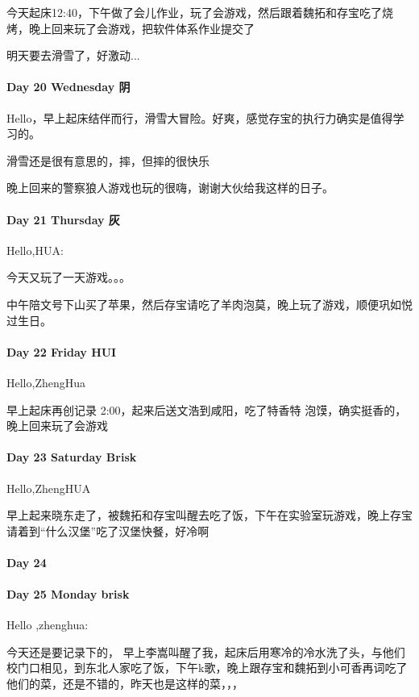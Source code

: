 \documentclass[UTF8,a4paper,8pt]{ctexbook}
\begin{document}
	     今天起床12:40，下午做了会儿作业，玩了会游戏，然后跟着魏拓和存宝吃了烧烤，晚上回来玩了会游戏，把软件体系作业提交了
	     
	     明天要去滑雪了，好激动...
     
     \paragraph{Day 20  Wednesday   \quad    阴 }
     
	     Hello，早上起床结伴而行，滑雪大冒险。好爽，感觉存宝的执行力确实是值得学习的。
	     
	     滑雪还是很有意思的，摔，但摔的很快乐
	     
	     晚上回来的警察狼人游戏也玩的很嗨，谢谢大伙给我这样的日子。
     \paragraph{Day 21  Thursday    \quad    灰 }
	     Hello,HUA:
	     
	     今天又玩了一天游戏。。。
	     
	     中午陪文号下山买了苹果，然后存宝请吃了羊肉泡莫，晚上玩了游戏，顺便巩如悦过生日。
     \paragraph{Day 22  Friday    \quad   HUI  }
	     Hello,ZhengHua
	     
	     早上起床再创记录 2:00，起来后送文浩到咸阳，吃了特香特 泡馍，确实挺香的，晚上回来玩了会游戏
     \paragraph{Day 23  Saturday    \quad   Brisk  }
     
	     Hello,ZhengHUA
	     
	     早上起来晓东走了，被魏拓和存宝叫醒去吃了饭，下午在实验室玩游戏，晚上存宝请着到“什么汉堡”吃了汉堡快餐，好冷啊
     \paragraph{Day 24      \quad     }
     \paragraph{Day 25  Monday    \quad   brisk  }
	     Hello ,zhenghua:
	     
	     今天还是要记录下的， 早上李嵩叫醒了我，起床后用寒冷的冷水洗了头，与他们校门口相见，到东北人家吃了饭，下午k歌，晚上跟存宝和魏拓到小可香再词吃了他们的菜，还是不错的，昨天也是这样的菜，，，
	     
\end{document}
